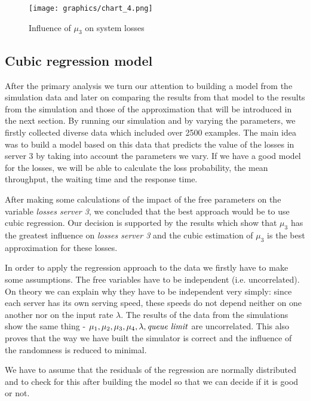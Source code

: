 \documentclass[12pt]{article}
\theoremstyle{plain}
\begin{document}
\begin{figure}
  \caption{Influence of $\mu_3$ on system losses}
  \texttt{[image: graphics/chart\_4.png]}\\
  \label{fig:influence_of_mu3_on_system:losses}
\end{figure}

\subsection*{\textbf{Cubic regression model}
}

After the primary analysis we turn our attention to building a model from the
simulation data and later on comparing the results from that model to the
results from the simulation and those of the approximation that will be
introduced in the next section. By running our simulation and by varying the
parameters, we firstly collected diverse data which included over 2500
examples. The main idea was to build a model based on this data that predicts
the value of the losses in server 3 by taking into account the parameters we
vary. If we have a good model for the losses, we will be able to calculate the
loss probability, the mean throughput, the waiting time and the response time.

After making some calculations of the impact of the free parameters on the
variable \emph{losses server 3}, we concluded that the best approach would be
to use cubic regression. Our decision is supported by the results which show
that $\mu_3$ has the greatest influence on \emph{losses server 3} and the cubic
estimation of $\mu_3$ is the best approximation for these losses.

In order to apply the regression approach to the data we firstly have to make
some assumptions. The free variables have to be independent (i.e.
uncorrelated). On theory we can explain why they have to be independent very
simply: since each server has its own serving speed, these speeds do not depend
neither on one another nor on the input rate $\lambda$. The results of the
data from the simulations show the same thing -
$\mu_1, \mu_2, \mu_3, \mu_4, \lambda, \text{\emph{queue limit}}$ are uncorrelated.
This also proves that the way we have built the simulator is correct and the
influence of the randomness is reduced to minimal. 

We have to assume that the residuals of the regression are normally distributed
and to check for this after building the model so that we can decide if it is
good or not.
\end{document}
